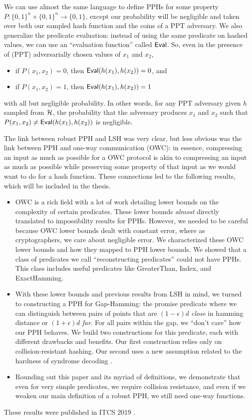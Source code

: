 We can use almost the same language to define PPHs for some property $P:\{0,1\}^n \times \{0,1\}^n \to \{0,1\}$, except our probability will be negligible and taken over both our sampled hash function and the coins of a PPT adversary. We also generalize the predicate evaluation: instead of using the same predicate on hashed values, we can use an ``evaluation function'' called $\mathsf{Eval}$. So, even in the presence of (PPT) adversarially chosen values of $x_1$ and $x_2$,
\begin{itemize}
	\item if $P(x_1, x_2) = 0$, then $\mathsf{Eval}(h(x_1), h(x_2)) = 0$, and
	\item if $P(x_1, x_2) = 1$, then $\mathsf{Eval}(h(x_1), h(x_2)) = 1$
\end{itemize}
with all but negligible probability.
In other words, for any PPT adversary given $h$ sampled from ${\cal H}$, the probability that the adversary produces $x_1$ and $x_2$ such that $P(x_1,x_2) \neq \mathsf{Eval}(h(x_1), h(x_2))$ is negligible.

The link between robust PPH and LSH was very clear, but less obvious was the link between PPH and one-way communication (OWC): in essence, compressing an input as much as possible for a OWC protocol is akin to compressing an input as much as possible while preserving some property of that input as we would want to do for a hash function. These connections led to the following results, which will be included in the thesis.
\begin{itemize}
	\item OWC is a rich field with a lot of work detailing lower bounds on the complexity of certain predicates. These lower bounds \emph{almost} directly translated to impossibility results for PPHs. However, we needed to be careful because OWC lower bounds dealt with constant error, where as cryptographers, we care about negligible error. We characterized these OWC lower bounds and how they mapped to PPH lower bounds. We showed that a class of predicates we call ``reconstructing predicates'' could not have PPHs. This class includes useful predicates like GreaterThan, Index, and ExactHamming.
	\item With these lower bounds and previous results from LSH in mind, we turned to constructing a PPH for Gap-Hamming: the promise predicate where we can distinguish between pairs of points that are $(1-\epsilon)d$ \emph{close} in hamming distance or $(1 + \epsilon)d$ \emph{far}. For all pairs within the gap, we ``don't care'' how our PPH behaves. We build two constructions for this predicate, each with different drawbacks and benefits. Our first construction relies only on collision-resistant hashing. Our second uses a new assumption related to the hardness of syndrome decoding \cite{AHIKV17}.
	\item Rounding out this paper and its myriad of definitions, we demonstrate that even for very simple predicates, we require collision resistance, and even if we weaken our main definition of a robust PPH, we still need one-way functions.
\end{itemize}
These results were published in ITCS 2019 \cite{BLV19}.


